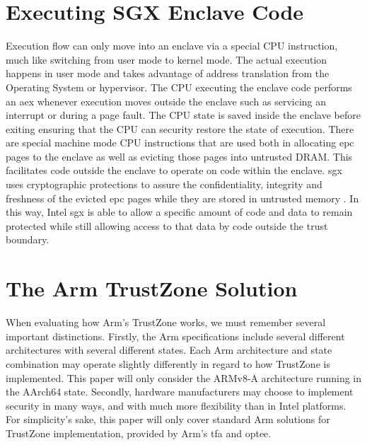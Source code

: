\section{Executing SGX Enclave Code}
Execution flow can only move into an enclave via a special CPU instruction, much like switching from user mode to kernel mode. The actual execution happens in user mode and takes advantage of address translation from the Operating System or hypervisor. The CPU executing the enclave code performs an \gls{aex} whenever execution moves outside the enclave such as servicing an interrupt or during a page fault. The CPU state is saved inside the enclave before exiting ensuring that the CPU can security restore the state of execution. There are special machine mode CPU instructions that are used both in allocating \gls{epc} pages to the enclave as well as evicting those pages into untrusted DRAM. This facilitates code outside the enclave to operate on code within the enclave. \gls{sgx} uses cryptographic protections to assure the confidentiality, integrity and freshness of the evicted \gls{epc} pages while they are stored in untrusted memory \cite{intel-sgx-explained}. In this way, Intel \gls{sgx} is able to allow a specific amount of code and data to remain protected while still allowing access to that data by code outside the trust boundary.
\section{The Arm TrustZone Solution}
When evaluating how Arm’s TrustZone works, we must remember several important distinctions. Firstly, the Arm specifications include several different architectures with several different states. Each Arm architecture and state combination may operate slightly differently in regard to how TrustZone is implemented. This paper will only consider the ARMv8-A architecture running in the AArch64 state. Secondly, hardware manufacturers may choose to implement security in many ways, and with much more flexibility than in Intel platforms. For simplicity’s sake, this paper will only cover standard Arm solutions for TrustZone implementation, provided by Arm's \gls{tfa} and \gls{optee}.
 
